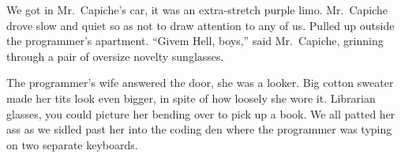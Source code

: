 \documentclass[oneside]{book}
\begin{document}
We got in Mr.~Capiche's car, it was an extra-stretch purple limo.  Mr.~Capiche drove
slow and quiet so as not to draw attention to any of us.  Pulled up outside the
programmer's apartment.  ``Givem Hell, boys,'' said Mr.~Capiche, grinning through a
pair of oversize novelty sunglasses.

The programmer's wife answered the door, she was a looker.  Big cotton sweater
made her tits look even bigger, in spite of how loosely she wore it.
Librarian glasses, you could picture her bending over to pick up a book.
We all patted her ass as we sidled past her into the coding den where the
programmer was typing on two separate keyboards.










\end{document}
